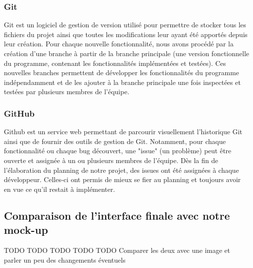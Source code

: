 \subsubsection{Git}
Git est un logiciel de gestion de version utilisé pour permettre de stocker tous les fichiers du projet ainsi que toutes les modifications leur ayant été apportés depuis leur création. Pour chaque nouvelle fonctionnalité, nous avons procédé par la création d'une branche à partir de la branche principale (une version fonctionnelle du programme, contenant les fonctionnalités implémentées et testées). Ces nouvelles branches permettent de développer les fonctionnalités du programme indépendamment et de les ajouter à la branche principale une fois inspectées et testées par plusieurs membres de l'équipe.

\subsubsection{GitHub}
Github est un service web permettant de parcourir visuellement l'historique Git ainsi que de fournir des outils de gestion de Git. Notamment, pour chaque fonctionnalité ou chaque bug découvert, une "issue" (un problème) peut être ouverte et assignée à un ou plusieurs membres de l'équipe. Dès la fin de l'élaboration du planning de notre projet, des issues ont été assignées à chaque développeur. Celles-ci ont permis de mieux se fier au planning et toujours avoir en vue ce qu'il restait à implémenter.

\subsection{Comparaison de l'interface finale avec notre mock-up}
TODO TODO TODO TODO TODO Comparer les deux avec une image et parler un peu des changements éventuels